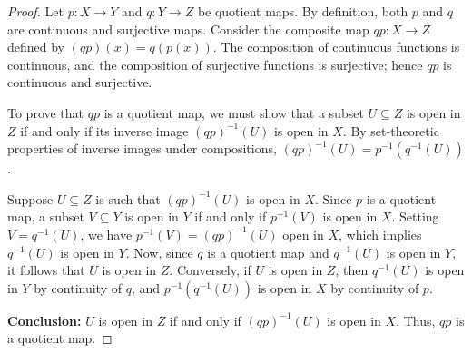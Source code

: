 
\begin{proof}
Let $p\colon X\to Y$ and $q\colon Y\to Z$ be quotient maps. By definition, both $p$ and $q$ are
continuous and surjective maps. Consider the composite map $qp\colon X\to Z$ defined by
$(qp)(x)=q(p(x))$. The composition of continuous functions is continuous, and the composition of
surjective functions is surjective; hence $qp$ is continuous and surjective.

To prove that $qp$ is a quotient map, we must show that a subset $U\subseteq Z$ is open in $Z$
if and only if its inverse image $(qp)^{-1}(U)$ is open in $X$. By set-theoretic properties of
inverse images under compositions, $(qp)^{-1}(U)=p^{-1}(q^{-1}(U))$.

Suppose $U\subseteq Z$ is such that $(qp)^{-1}(U)$ is open in $X$. Since $p$ is a quotient map,
a subset $V\subseteq Y$ is open in $Y$ if and only if $p^{-1}(V)$ is open in $X$. Setting
$V=q^{-1}(U)$, we have $p^{-1}(V)=(qp)^{-1}(U)$ open in $X$, which implies $q^{-1}(U)$ is open in
$Y$. Now, since $q$ is a quotient map and $q^{-1}(U)$ is open in $Y$, it follows that $U$ is
open in $Z$. Conversely, if $U$ is open in $Z$, then $q^{-1}(U)$ is open in $Y$ by continuity
of $q$, and $p^{-1}(q^{-1}(U))$ is open in $X$ by continuity of $p$.

\textbf{Conclusion:} $U$ is open in $Z$ if and only if $(qp)^{-1}(U)$ is open in $X$. Thus,
$qp$ is a quotient map.
\end{proof}
